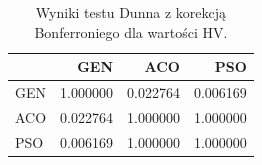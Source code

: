 \begin{table}
\caption{Wyniki testu Dunna z korekcją Bonferroniego dla wartości HV.}
\label{tab:dunn_global}
\begin{tabular}{lrrr}
\toprule
 & GEN & ACO & PSO \\
\midrule
GEN & 1.000000 & 0.022764 & 0.006169 \\
ACO & 0.022764 & 1.000000 & 1.000000 \\
PSO & 0.006169 & 1.000000 & 1.000000 \\
\bottomrule
\end{tabular}
\end{table}
